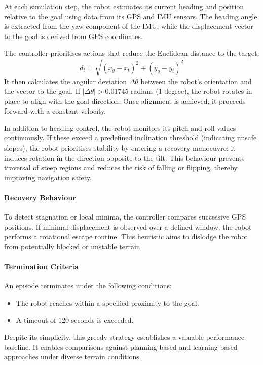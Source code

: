 \documentclass[11pt,twocolumn]{article}
\begin{document}
At each simulation step, the robot estimates its current heading and position relative to the goal using data from its GPS and IMU sensors. The heading angle is extracted from the yaw component of the IMU, while the displacement vector to the goal is derived from GPS coordinates.

The controller prioritises actions that reduce the Euclidean distance to the target:
\[
d_t = \sqrt{(x_g - x_t)^2 + (y_g - y_t)^2}
\]
It then calculates the angular deviation $\Delta\theta$ between the robot's orientation and the vector to the goal. If $|\Delta\theta| > 0.01745$ radians (1 degree), the robot rotates in place to align with the goal direction. Once alignment is achieved, it proceeds forward with a constant velocity.

In addition to heading control, the robot monitors its pitch and roll values continuously. If these exceed a predefined inclination threshold (indicating unsafe slopes), the robot prioritises stability by entering a recovery manoeuvre: it induces rotation in the direction opposite to the tilt. This behaviour prevents traversal of steep regions and reduces the risk of falling or flipping, thereby improving navigation safety.

\paragraph{Recovery Behaviour}

To detect stagnation or local minima, the controller compares successive GPS positions. If minimal displacement is observed over a defined window, the robot performs a rotational escape routine. This heuristic aims to dislodge the robot from potentially blocked or unstable terrain.

\paragraph{Termination Criteria}

An episode terminates under the following conditions:

\begin{itemize}
    \item The robot reaches within a specified proximity to the goal.
    \item A timeout of 120 seconds is exceeded.
\end{itemize}

Despite its simplicity, this greedy strategy establishes a valuable performance baseline. It enables comparisons against planning-based and learning-based approaches under diverse terrain conditions.
\end{document}

